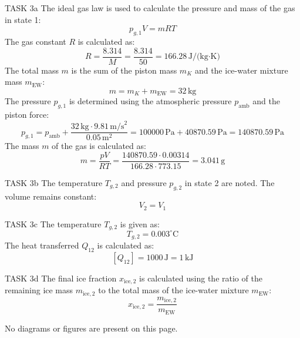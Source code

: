 TASK 3a  
The ideal gas law is used to calculate the pressure and mass of the gas in state 1:  
\[
p_{g,1} V = mRT
\]  
The gas constant \( R \) is calculated as:  
\[
R = \frac{8.314}{M} = \frac{8.314}{50} = 166.28 \, \text{J/(kg·K)}
\]  
The total mass \( m \) is the sum of the piston mass \( m_K \) and the ice-water mixture mass \( m_{\text{EW}} \):  
\[
m = m_K + m_{\text{EW}} = 32 \, \text{kg}
\]  
The pressure \( p_{g,1} \) is determined using the atmospheric pressure \( p_{\text{amb}} \) and the piston force:  
\[
p_{g,1} = p_{\text{amb}} + \frac{32 \, \text{kg} \cdot 9.81 \, \text{m/s}^2}{0.05 \, \text{m}^2} = 100000 \, \text{Pa} + 40870.59 \, \text{Pa} = 140870.59 \, \text{Pa}
\]  
The mass \( m \) of the gas is calculated as:  
\[
m = \frac{p V}{RT} = \frac{140870.59 \cdot 0.00314}{166.28 \cdot 773.15} = 3.041 \, \text{g}
\]  

TASK 3b  
The temperature \( T_{g,2} \) and pressure \( p_{g,2} \) in state 2 are noted. The volume remains constant:  
\[
V_2 = V_1
\]  

TASK 3c  
The temperature \( T_{g,2} \) is given as:  
\[
T_{g,2} = 0.003^\circ \text{C}
\]  
The heat transferred \( Q_{12} \) is calculated as:  
\[
[Q_{12}] = 1000 \, \text{J} = 1 \, \text{kJ}
\]  

TASK 3d  
The final ice fraction \( x_{\text{ice},2} \) is calculated using the ratio of the remaining ice mass \( m_{\text{ice},2} \) to the total mass of the ice-water mixture \( m_{\text{EW}} \):  
\[
x_{\text{ice},2} = \frac{m_{\text{ice},2}}{m_{\text{EW}}}
\]  

No diagrams or figures are present on this page.